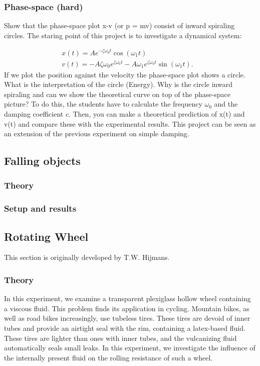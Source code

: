 \documentclass{article}
\begin{document}
\subsubsection{Phase-space (hard)}    
Show that the phase-space plot x-v (or p = mv) consist of inward spiraling circles. The staring point of this project is to investigate a dynamical system:

\begin{align}
    x(t) = Ae^{-\zeta\omega_0t}\cos(\omega_1 t) & \\
    v(t) = -A \zeta \omega_0 e^{\zeta \omega_0 t} - A \omega_1e^{\zeta \omega_0 t}\sin(\omega_1 t).
\end{align}
If we plot the position against the velocity the phase-space plot shows a circle. What is the interpretation of the circle (Energy). Why is the circle inward spiraling and can we show the theoretical curve on top of the phase-space picture? To do this, the students have to calculate the frequency $\omega_0$ and the damping coefficient $c$. Then, you can make a theoretical prediction of x(t) and v(t) and compare these with the experimental results. This project can be seen as an extension of the previous experiment on simple damping.

\newpage

\subsection{Falling objects}
\subsubsection{Theory}
\subsubsection{Setup and results}

\newpage

\subsection{Rotating Wheel}
This section is originally developed by T.W. Hijmans.
\subsubsection{Theory}
In this experiment, we examine a transparent plexiglass hollow wheel containing a viscous fluid. This problem finds its application in cycling. Mountain bikes, as well as road bikes increasingly, use tubeless tires. These tires are devoid of inner tubes and provide an airtight seal with the rim, containing a latex-based fluid. These tires are lighter than ones with inner tubes, and the vulcanizing fluid automatically seals small leaks. In this experiment, we investigate the influence of the internally present fluid on the rolling resistance of such a wheel.
\end{document}
